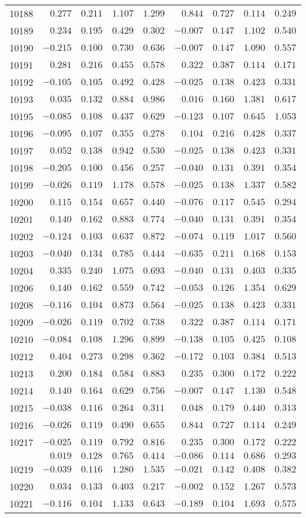 \documentclass[6pt]{article}
\begin{document}
\begin{landscape}
{\begin{longtable}{lrrrrrrrr}
10188&$ 0.277$&$0.211$&$1.107$&$1.299$&$ 0.844$&$0.727$&$0.114$&$0.249$\tabularnewline
10189&$ 0.234$&$0.195$&$0.429$&$0.302$&$-0.007$&$0.147$&$1.102$&$0.540$\tabularnewline
10190&$-0.215$&$0.100$&$0.730$&$0.636$&$-0.007$&$0.147$&$1.090$&$0.557$\tabularnewline
10191&$ 0.281$&$0.216$&$0.455$&$0.578$&$ 0.322$&$0.387$&$0.114$&$0.171$\tabularnewline
10192&$-0.105$&$0.105$&$0.492$&$0.428$&$-0.025$&$0.138$&$0.423$&$0.331$\tabularnewline
10193&$ 0.035$&$0.132$&$0.884$&$0.986$&$ 0.016$&$0.160$&$1.381$&$0.617$\tabularnewline
10195&$-0.085$&$0.108$&$0.437$&$0.629$&$-0.123$&$0.107$&$0.645$&$1.053$\tabularnewline
10196&$-0.095$&$0.107$&$0.355$&$0.278$&$ 0.104$&$0.216$&$0.428$&$0.337$\tabularnewline
10197&$ 0.052$&$0.138$&$0.942$&$0.530$&$-0.025$&$0.138$&$0.423$&$0.331$\tabularnewline
10198&$-0.205$&$0.100$&$0.456$&$0.257$&$-0.040$&$0.131$&$0.391$&$0.354$\tabularnewline
10199&$-0.026$&$0.119$&$1.178$&$0.578$&$-0.025$&$0.138$&$1.337$&$0.582$\tabularnewline
10200&$ 0.115$&$0.154$&$0.657$&$0.440$&$-0.076$&$0.117$&$0.545$&$0.294$\tabularnewline
10201&$ 0.140$&$0.162$&$0.883$&$0.774$&$-0.040$&$0.131$&$0.391$&$0.354$\tabularnewline
10202&$-0.124$&$0.103$&$0.637$&$0.872$&$-0.074$&$0.119$&$1.017$&$0.560$\tabularnewline
10203&$-0.040$&$0.134$&$0.785$&$0.444$&$-0.635$&$0.211$&$0.168$&$0.153$\tabularnewline
10204&$ 0.335$&$0.240$&$1.075$&$0.693$&$-0.040$&$0.131$&$0.403$&$0.335$\tabularnewline
10206&$ 0.140$&$0.162$&$0.559$&$0.742$&$-0.053$&$0.126$&$1.354$&$0.629$\tabularnewline
10208&$-0.116$&$0.104$&$0.873$&$0.564$&$-0.025$&$0.138$&$0.423$&$0.331$\tabularnewline
10209&$-0.026$&$0.119$&$0.702$&$0.738$&$ 0.322$&$0.387$&$0.114$&$0.171$\tabularnewline
10210&$-0.084$&$0.108$&$1.296$&$0.899$&$-0.138$&$0.105$&$0.425$&$0.108$\tabularnewline
10212&$ 0.404$&$0.273$&$0.298$&$0.362$&$-0.172$&$0.103$&$0.384$&$0.513$\tabularnewline
10213&$ 0.200$&$0.184$&$0.584$&$0.883$&$ 0.235$&$0.300$&$0.172$&$0.222$\tabularnewline
10214&$ 0.140$&$0.164$&$0.629$&$0.756$&$-0.007$&$0.147$&$1.130$&$0.548$\tabularnewline
10215&$-0.038$&$0.116$&$0.264$&$0.311$&$ 0.048$&$0.179$&$0.440$&$0.313$\tabularnewline
10216&$-0.026$&$0.119$&$0.490$&$0.655$&$ 0.844$&$0.727$&$0.114$&$0.249$\tabularnewline
10217&$-0.025$&$0.119$&$0.792$&$0.816$&$ 0.235$&$0.300$&$0.172$&$0.222$\tabularnewline
\newpage
10218&$ 0.019$&$0.128$&$0.765$&$0.414$&$-0.086$&$0.114$&$0.686$&$0.293$\tabularnewline
10219&$-0.039$&$0.116$&$1.280$&$1.535$&$-0.021$&$0.142$&$0.408$&$0.382$\tabularnewline
10220&$ 0.034$&$0.133$&$0.403$&$0.217$&$-0.002$&$0.152$&$1.267$&$0.573$\tabularnewline
10221&$-0.116$&$0.104$&$1.133$&$0.643$&$-0.189$&$0.104$&$1.693$&$0.575$\tabularnewline

\end{longtable}}
\end{landscape}
\end{document}
